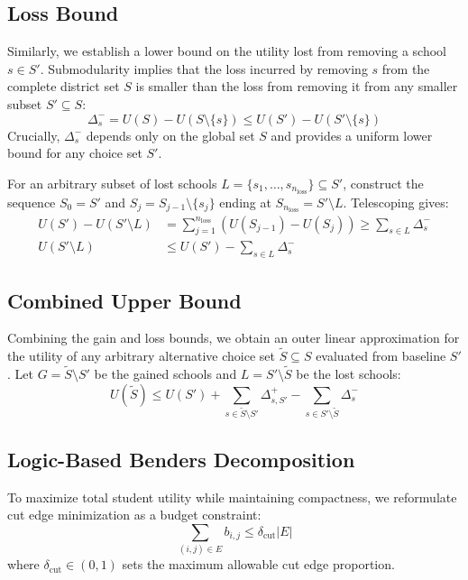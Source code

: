 \documentclass{article}
\begin{document}
\subsection{Loss Bound}
Similarly, we establish a lower bound on the utility lost from removing a school $s \in S'$. Submodularity implies that the loss incurred by removing $s$ from the complete district set $S$ is smaller than the loss from removing it from any smaller subset $S' \subseteq S$:
\begin{equation}\label{eq:loss-bound}
\Delta_s^- = U(S) - U(S \setminus \{s\}) \leq U(S') - U(S' \setminus \{s\})
\end{equation}
Crucially, $\Delta_s^-$ depends only on the global set $S$ and provides a uniform lower bound for any choice set $S'$.

For an arbitrary subset of lost schools $L = \{s_1, \dots, s_{n_{\text{loss}}}\} \subseteq S'$, construct the sequence $S_0 = S'$ and $S_j = S_{j-1} \setminus \{s_j\}$ ending at $S_{n_{\text{loss}}} = S' \setminus L$. Telescoping gives:
\begin{equation} \label{eq:total-loss-bound}
\begin{aligned}
U(S') - U(S' \setminus L) &= \sum_{j=1}^{n_{\text{loss}}} \left( U(S_{j-1}) - U(S_j) \right) \geq \sum_{s \in L} \Delta_s^- \\
U(S' \setminus L) &\leq U(S') - \sum_{s \in L} \Delta_s^-
\end{aligned}
\end{equation}

\subsection{Combined Upper Bound}
Combining the gain and loss bounds, we obtain an outer linear approximation for the utility of any arbitrary alternative choice set $\tilde{S} \subseteq S$ evaluated from baseline $S'$. Let $G = \tilde{S} \setminus S'$ be the gained schools and $L = S' \setminus \tilde{S}$ be the lost schools:
\begin{equation} \label{eq:total-bound}
U(\tilde{S}) \leq U(S') + \sum_{s \in \tilde{S} \setminus S'} \Delta_{s, S'}^+ - \sum_{s \in S' \setminus \tilde{S}} \Delta_s^-
\end{equation}

\subsection{Logic-Based Benders Decomposition}
To maximize total student utility while maintaining compactness, we reformulate cut edge minimization as a budget constraint:
$$\sum_{(i,j)\in E} b_{i,j} \leq \delta_{\text{cut}} |E|$$
where $\delta_{\text{cut}} \in (0, 1)$ sets the maximum allowable cut edge proportion.
\end{document}
